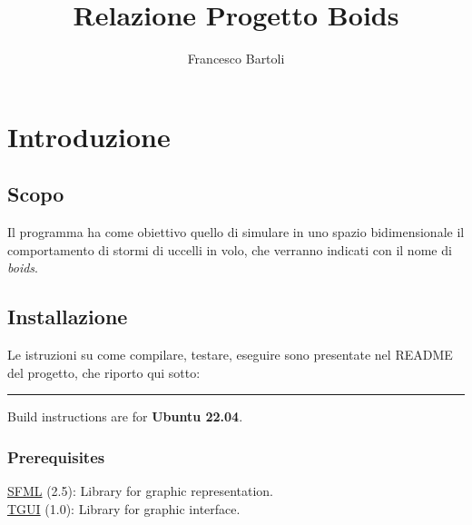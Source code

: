 \documentclass[10pt,a4paper]{article}
\title{Relazione Progetto Boids}
\author{Francesco Bartoli}
\date{}
\begin{document}
\setlength{\parindent}{0pt}

\maketitle

\section{Introduzione}
\subsection{Scopo}
Il programma ha come obiettivo quello di simulare in uno spazio bidimensionale il comportamento di stormi di uccelli in volo, che verranno indicati con il nome di \textit{boids}. 

\subsection{Installazione}

Le istruzioni su come compilare, testare, eseguire sono presentate nel README del progetto, che riporto qui sotto:

\par\noindent\rule{\textwidth}{0.4pt}

Build instructions are for \textbf{Ubuntu 22.04}.

\subsubsection{Prerequisites}

\href{https://github.com/SFML/SFML}{SFML} (2.5): Library for graphic representation. \\
\href{https://github.com/texus/TGUI}{TGUI} (1.0): Library for graphic interface.





\end{document}
